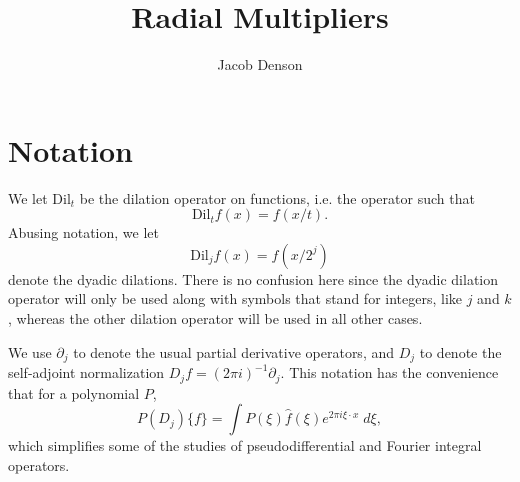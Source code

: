     

\title{Radial Multipliers}
\author{Jacob Denson}



\maketitle

\tableofcontents

\newpage

\chapter{Notation}

We let $\text{Dil}_t$ be the dilation operator on functions, i.e. the operator such that
%
\[ \text{Dil}_t f(x) = f(x/t). \]
%
Abusing notation, we let
%
\[ \text{Dil}_j f(x) = f(x/2^j) \]
%
denote the dyadic dilations. There is no confusion here since the dyadic dilation operator will only be used along with symbols that stand for integers, like $j$ and $k$, whereas the other dilation operator will be used in all other cases.

We use $\partial_j$ to denote the usual partial derivative operators, and $D_j$ to denote the self-adjoint normalization $D_j f = (2 \pi i)^{-1} \partial_j$. This notation has the convenience that for a polynomial $P$,
%
\[ P(D_j) \{ f \} = \int P(\xi) \widehat{f}(\xi) e^{2 \pi i \xi \cdot x}\; d\xi, \]
%
which simplifies some of the studies of pseudodifferential and Fourier integral operators.

%


